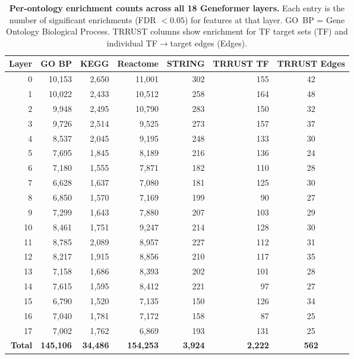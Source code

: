 \documentclass[onecolumn]{article}
\begin{document}
\begin{table}[H]
\centering
\caption{\textbf{Per-ontology enrichment counts across all 18 Geneformer layers.} Each entry is the number of significant enrichments (FDR $< 0.05$) for features at that layer. GO~BP = Gene Ontology Biological Process. TRRUST columns show enrichment for TF target sets (TF) and individual TF$\to$target edges (Edges).}
\label{tab:perontology}
\smallskip
\begin{tabular}{rrrrrrc}
\toprule
Layer & GO BP & KEGG & Reactome & STRING & TRRUST TF & TRRUST Edges \\
\midrule
0  & 10,153 & 2,650 & 11,001 & 302 & 155 & 42 \\
1  & 10,022 & 2,433 & 10,512 & 258 & 164 & 48 \\
2  & 9,948  & 2,495 & 10,790 & 283 & 150 & 32 \\
3  & 9,726  & 2,514 & 9,525  & 273 & 157 & 37 \\
4  & 8,537  & 2,045 & 9,195  & 248 & 133 & 30 \\
5  & 7,695  & 1,845 & 8,189  & 216 & 136 & 24 \\
6  & 7,180  & 1,555 & 7,871  & 182 & 110 & 28 \\
7  & 6,628  & 1,637 & 7,080  & 181 & 125 & 30 \\
8  & 6,850  & 1,570 & 7,169  & 199 & 90  & 27 \\
9  & 7,299  & 1,643 & 7,880  & 207 & 103 & 29 \\
10 & 8,461  & 1,751 & 9,247  & 214 & 128 & 30 \\
11 & 8,785  & 2,089 & 8,957  & 227 & 112 & 31 \\
12 & 8,217  & 1,915 & 8,856  & 210 & 117 & 35 \\
13 & 7,158  & 1,686 & 8,393  & 202 & 101 & 28 \\
14 & 7,615  & 1,595 & 8,412  & 221 & 97  & 27 \\
15 & 6,790  & 1,520 & 7,135  & 150 & 126 & 34 \\
16 & 7,040  & 1,781 & 7,172  & 158 & 87  & 25 \\
17 & 7,002  & 1,762 & 6,869  & 193 & 131 & 25 \\
\midrule
\textbf{Total} & \textbf{145,106} & \textbf{34,486} & \textbf{154,253} & \textbf{3,924} & \textbf{2,222} & \textbf{562} \\
\bottomrule
\end{tabular}
\end{table}
\end{document}
